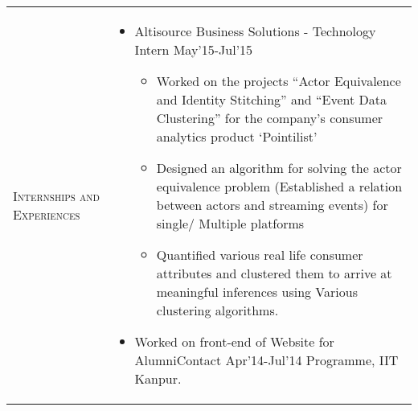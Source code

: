 \documentclass[a4paper]{article}
\begin{document}
\begin{longtable}{@{}m{3.0cm}m{14cm}@{}}
  \textrm{\textsc{Internships and Experiences}} &
                                                  \vspace{-2mm}
                                                  \begin{itemize} 
                                                  \item 
                                                    Altisource Business Solutions - Technology Intern \hfill  May'15-Jul'15
                                                    \begin{itemize} \itemsep -2pt
                                                    \item Worked on the projects ``Actor Equivalence and Identity Stitching'' and ``Event Data Clustering''
                                                      for the company's consumer analytics product `Pointilist'
                                                    \item Designed an algorithm for solving the actor equivalence problem (Established a relation between
                                                      actors and streaming events) for single/ Multiple platforms
                                                    \item Quantified various real life consumer attributes and clustered them to arrive at meaningful
                                                      inferences using Various clustering algorithms. 
                                                    \end{itemize}
                                                  \item
                                                    Worked on front-end of Website for AlumniContact \hfill Apr'14-Jul'14  \newline 
                                                    Programme, IIT Kanpur.
                                                  \end{itemize} \vspace*{-\baselineskip}

\\


\end{longtable}
\end{document}
